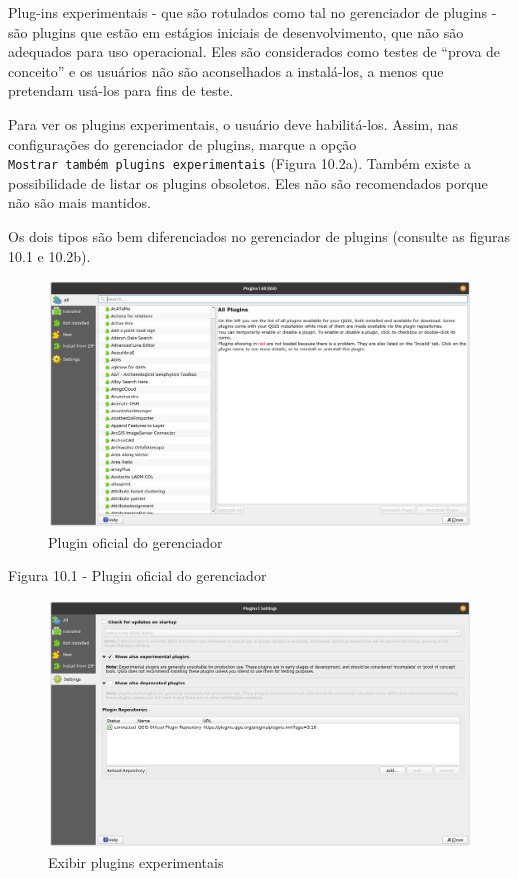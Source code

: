 \documentclass[
]{krantz}
\begin{document}
Plug-ins experimentais - que são rotulados como tal no gerenciador de plugins - são plugins que estão em estágios iniciais de desenvolvimento, que não são adequados para uso operacional. Eles são considerados como testes de ``prova de conceito'' e os usuários não são aconselhados a instalá-los, a menos que pretendam usá-los para fins de teste.

Para ver os plugins experimentais, o usuário deve habilitá-los. Assim, nas configurações do gerenciador de plugins, marque a opção \texttt{Mostrar\ também\ plugins\ experimentais} (Figura 10.2a). Também existe a possibilidade de listar os plugins obsoletos. Eles não são recomendados porque não são mais mantidos.

Os dois tipos são bem diferenciados no gerenciador de plugins (consulte as figuras 10.1 e 10.2b).

\begin{figure}
\centering
\includegraphics{media/modulo10/fig101.png}
\caption{Plugin oficial do gerenciador}
\end{figure}

Figura 10.1 - Plugin oficial do gerenciador

\begin{figure}
\centering
\includegraphics{media/modulo10/fig102_a.png}
\caption{Exibir plugins experimentais}
\end{figure}
\end{document}
